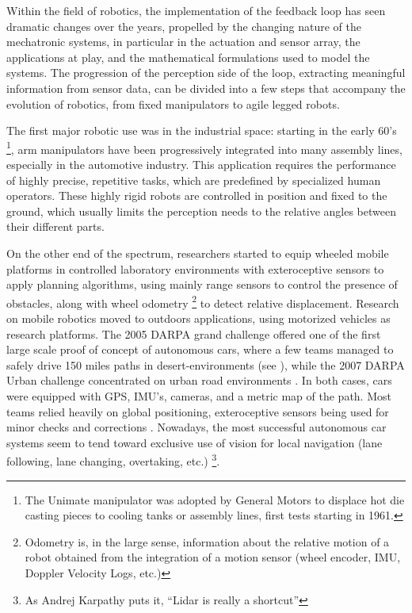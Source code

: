 Within the field of robotics, the implementation of the feedback loop has seen dramatic changes over the years, propelled by the changing nature 
of the mechatronic systems, in particular in the actuation and sensor array, the applications at play, and the mathematical formulations
used to model the systems. The progression of the perception side of the loop, extracting meaningful information from sensor data, can be divided into a few
steps that accompany the evolution of robotics, from fixed manipulators to agile legged robots. 

The first major robotic use was in the industrial space: 
starting in the early 60's \footnote{The Unimate manipulator  was adopted by General Motors to displace hot die casting pieces to cooling tanks or assembly lines, first tests starting in 1961.}, 
arm manipulators have been progressively integrated into many assembly lines, especially in the automotive industry. 
This application requires the performance of highly precise, repetitive tasks, which are predefined by specialized human operators.
These highly rigid robots are controlled in position and fixed to the ground, which usually limits the perception needs to the relative angles between their different parts.

On the other end of the spectrum, researchers started to equip wheeled mobile platforms  in controlled laboratory environments with exteroceptive sensors 
\cite{Nilsson1984ShakeyTR, chatila1985position} to apply planning algorithms, using mainly range sensors to control the presence of obstacles, along with wheel odometry \footnote{Odometry is, in the large sense, information 
about the relative motion of a robot obtained from the integration of a motion sensor (wheel encoder, IMU, Doppler Velocity Logs, etc.)}
to detect relative displacement. 
Research on mobile robotics moved to outdoors applications, using motorized vehicles as research platforms. The 2005 DARPA grand challenge
offered one of the first large scale proof of concept of autonomous cars, where a few teams managed to safely drive 150 miles paths in desert-environments 
\cite{thrun2006stanley} (see ), while the 2007 DARPA Urban challenge concentrated on urban road environments \cite{urmson2008autonomous}. In both cases, cars were 
equipped with GPS, IMU's, cameras, and a metric map of the path. Most teams relied heavily on global positioning, exteroceptive sensors being used for 
minor checks and corrections \cite{hillel2014recent}. Nowadays, the most successful autonomous car systems 
seem to tend toward exclusive use of vision for local navigation (lane following, lane changing, overtaking, etc.) \footnote{As Andrej Karpathy puts it, “Lidar is really a shortcut”}. 

